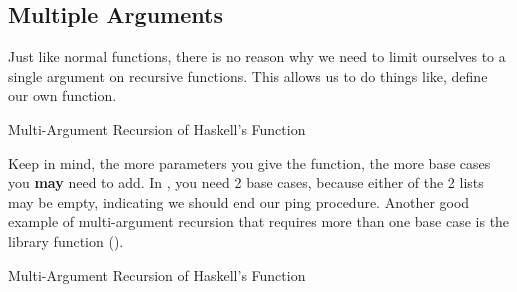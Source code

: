 \subsection{Multiple Arguments}\label{subsec:Multiple_Arguments}
Just like normal functions, there is no reason why we need to limit ourselves to a single argument on recursive functions.
This allows us to do things like, define our own  function.
\begin{listing}[h!tbp]
\caption{Multi-Argument Recursion of Haskell's  Function}
\label{lst:Multiple_Arguments-Zip}
\end{listing}

Keep in mind, the more parameters you give the function, the more base cases you \textbf{may} need to add.
In , you need 2 base cases, because either of the 2 lists may be empty, indicating we should end our ping procedure.
Another good example of multi-argument recursion that requires more than one base case is the  library function ().
\begin{listing}[h!tbp]
\caption{Multi-Argument Recursion of Haskell's  Function}
\label{lst:Multiple_Arguments-Drop}
\end{listing}

